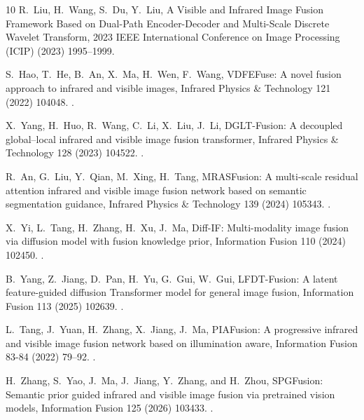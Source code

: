 \begin{thebibliography}{10}
R.~Liu, H.~Wang, S.~Du, Y.~Liu, {A Visible and Infrared Image Fusion Framework
  Based on Dual-Path Encoder-Decoder and Multi-Scale Discrete Wavelet
  Transform}, 2023 IEEE International Conference on Image Processing (ICIP)
  (2023) 1995--1999\newblock \href {https://doi.org/10.1109/icip49359.2023.10222863}
  {}.

S.~Hao, T.~He, B.~An, X.~Ma, H.~Wen, F.~Wang, {VDFEFuse: A novel fusion
  approach to infrared and visible images}, Infrared Physics \& Technology 121
  (2022) 104048.
\newblock \href {https://doi.org/10.1016/j.infrared.2022.104048}
  {}.

X.~Yang, H.~Huo, R.~Wang, C.~Li, X.~Liu, J.~Li, {DGLT-Fusion: A decoupled
  global–local infrared and visible image fusion transformer}, Infrared
  Physics \& Technology 128 (2023) 104522.
\newblock \href {https://doi.org/10.1016/j.infrared.2022.104522}
  {}.

R.~An, G.~Liu, Y.~Qian, M.~Xing, H.~Tang, {MRASFusion: A multi-scale residual
  attention infrared and visible image fusion network based on semantic
  segmentation guidance}, Infrared Physics \& Technology 139 (2024) 105343.
\newblock \href {https://doi.org/10.1016/j.infrared.2024.105343}
  {}.

X.~Yi, L.~Tang, H.~Zhang, H.~Xu, J.~Ma, {Diff-IF: Multi-modality image fusion
  via diffusion model with fusion knowledge prior}, Information Fusion 110
  (2024) 102450.
\newblock \href {https://doi.org/10.1016/j.inffus.2024.102450}
  {}.

B.~Yang, Z.~Jiang, D.~Pan, H.~Yu, G.~Gui, W.~Gui, {LFDT-Fusion: A latent
  feature-guided diffusion Transformer model for general image fusion},
  Information Fusion 113 (2025) 102639.
\newblock \href {https://doi.org/10.1016/j.inffus.2024.102639}
  {}.

L.~Tang, J.~Yuan, H.~Zhang, X.~Jiang, J.~Ma, {PIAFusion: A progressive infrared
  and visible image fusion network based on illumination aware}, Information
  Fusion 83-84 (2022) 79--92.
\newblock \href {https://doi.org/10.1016/j.inffus.2022.03.007}
  {}.

H.~Zhang, S.~Yao, J.~Ma, J.~Jiang, Y.~Zhang, and H.~Zhou, {SPGFusion: Semantic
  prior guided infrared and visible image fusion via pretrained vision models},
  Information Fusion 125 (2026) 103433.
\newblock \href {https://doi.org/10.1016/j.inffus.2025.103433}
  {}.


\end{thebibliography}

